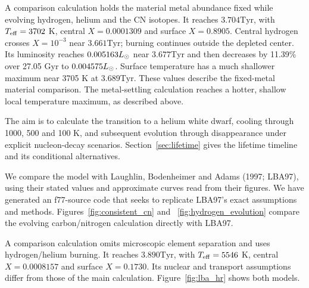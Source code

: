 \documentclass[11pt,letterpaper]{article}
\newcommand{\Tyr}{\mathrm{Tyr}}
\begin{document}
A comparison calculation holds the material metal abundance fixed while
evolving hydrogen, helium and the CN isotopes. It reaches $3.704\Tyr$,
with $T_{\rm eff}=3702$ K, central $X=0.0001309$ and surface $X=0.8905$.
Central hydrogen crosses $X=10^{-3}$ near $3.661\Tyr$; burning continues
outside the depleted center. Its luminosity reaches $0.005163L_\odot$ near
$3.677\Tyr$ and then decreases by 11.39\% over 27.05 Gyr to
$0.004575L_\odot$. Surface temperature has a much shallower maximum near
3705 K at $3.689\Tyr$. These values describe the fixed-metal material comparison. The metal-settling calculation reaches a hotter, shallow local
temperature maximum, as described above.

The aim is to calculate the transition to a helium white dwarf, cooling
through 1000, 500 and 100 K, and subsequent evolution through disappearance
under explicit nucleon-decay scenarios. Section~\ref{sec:lifetime} gives
the lifetime timeline and its conditional alternatives.

We compare the model with Laughlin, Bodenheimer and Adams (1997; LBA97),
using their stated values and approximate curves read from their figures.
We have generated an f77-source code that seeks to replicate LBA97's exact
assumptions and methods. Figures~\ref{fig:consistent_cn} and
~\ref{fig:hydrogen_evolution} compare the evolving carbon/nitrogen calculation
directly with LBA97.

A comparison calculation omits microscopic element separation and uses
hydrogen/helium burning. It reaches $3.890\Tyr$, with
$T_{\rm eff}=5546$ K, central $X=0.0008157$ and surface $X=0.1730$.
Its nuclear and transport assumptions differ from those of the main
calculation. Figure~\ref{fig:lba_hr} shows both models.
\end{document}
